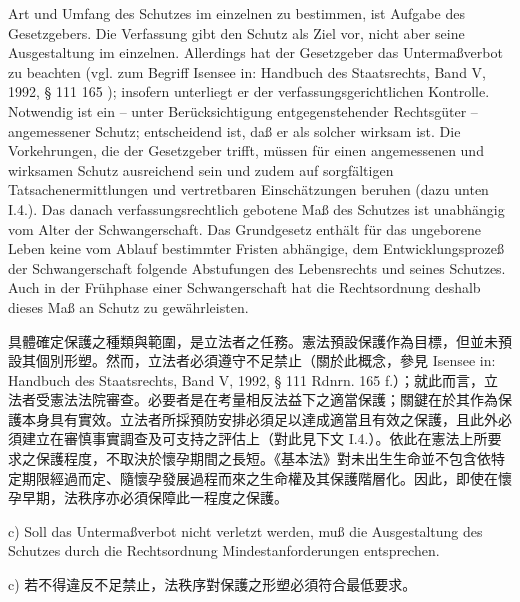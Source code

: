 \documentclass[12pt]{article}
\begin{document}
\begin{sourcepara}[title={原文D.45}]
Art und Umfang des Schutzes im einzelnen zu bestimmen, ist Aufgabe des Gesetzgebers. Die Verfassung gibt den Schutz als Ziel vor, nicht aber seine Ausgestaltung im einzelnen. Allerdings hat der Gesetzgeber das Untermaßverbot zu beachten (vgl. zum Begriff Isensee in: Handbuch des Staatsrechts, Band V, 1992, § 111 \abbrRdnrn{} 165 \abbrF{}); insofern unterliegt er der verfassungsgerichtlichen Kontrolle. Notwendig ist ein -- unter Berücksichtigung entgegenstehender Rechtsgüter -- angemessener Schutz; entscheidend ist, daß er als solcher wirksam ist. Die Vorkehrungen, die der Gesetzgeber trifft, müssen für einen angemessenen und wirksamen Schutz ausreichend sein und zudem auf sorgfältigen Tatsachenermittlungen und vertretbaren Einschätzungen beruhen (dazu unten I.4.). Das danach verfassungsrechtlich gebotene Maß des Schutzes ist unabhängig vom Alter der Schwangerschaft. Das Grundgesetz enthält für das ungeborene Leben keine vom Ablauf bestimmter Fristen abhängige, dem Entwicklungsprozeß der Schwangerschaft folgende Abstufungen des Lebensrechts und seines Schutzes. Auch in der Frühphase einer Schwangerschaft hat die Rechtsordnung deshalb dieses Maß an Schutz zu gewährleisten.
\end{sourcepara}
\begin{transpara}
具體確定保護之種類與範圍，是立法者之任務。憲法預設保護作為目標，但並未預設其個別形塑。然而，立法者必須遵守不足禁止（關於此概念，參見 Isensee in: Handbuch des Staatsrechts, Band V, 1992, § 111 Rdnrn. 165 f.）；就此而言，立法者受憲法法院審查。必要者是在考量相反法益下之適當保護；關鍵在於其作為保護本身具有實效。立法者所採預防安排必須足以達成適當且有效之保護，且此外必須建立在審慎事實調查及可支持之評估上（對此見下文 I.4.）。依此在憲法上所要求之保護程度，不取決於懷孕期間之長短。《基本法》對未出生生命並不包含依特定期限經過而定、隨懷孕發展過程而來之生命權及其保護階層化。因此，即使在懷孕早期，法秩序亦必須保障此一程度之保護。
\end{transpara}

\begin{sourcepara}[title={原文D.46}]
c) Soll das Untermaßverbot nicht verletzt werden, muß die Ausgestaltung des Schutzes durch die Rechtsordnung Mindestanforderungen entsprechen.
\end{sourcepara}
\begin{transpara}
c) 若不得違反不足禁止，法秩序對保護之形塑必須符合最低要求。
\end{transpara}
\end{document}
